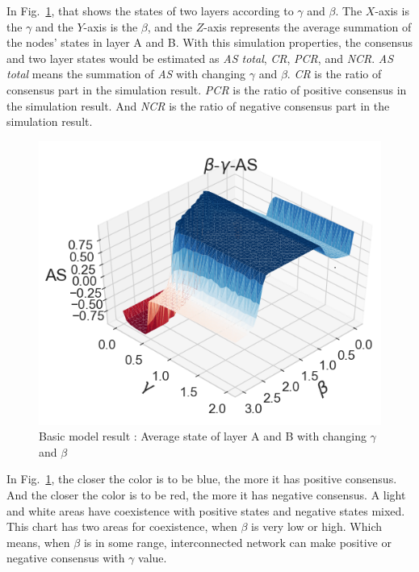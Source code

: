 \documentclass[english]{cccconf}
\begin{document}
In Fig.~\ref{Fig3}, that shows the states of two layers according to $\gamma$ and $\beta$. The $X$-axis is the $\gamma$ and the $Y$-axis is the $\beta$, and the $Z$-axis represents the average summation of the nodes' states in layer A and B. With this simulation properties, the consensus and two layer states would be estimated as \textit{AS total}, \textit{CR}, \textit{PCR}, and \textit{NCR}. \textit{AS total} means the summation of \textit{AS} with changing $\gamma$ and $\beta$. \textit{CR} is the ratio of consensus part in the simulation result. \textit{PCR} is the ratio of positive consensus in the simulation result. And \textit{NCR} is the ratio of negative consensus part in the simulation result.  
\begin{figure}[!htb]
  \centering
  \includegraphics[width=\hsize]{FIG3.png}
  \caption{Basic model result : Average state of layer A and B with changing $\gamma$ and $\beta$}
  \label{Fig3}
\end{figure}
In Fig.~\ref{Fig3}, the closer the color is to be blue, the more it has positive consensus. And the closer the color is to be red, the more it has negative consensus. A light and white areas have coexistence with positive states and negative states mixed. This chart has two areas for coexistence, when $\beta$ is very low or high. Which means, when $\beta$ is in some range, interconnected network can make positive or negative consensus with $\gamma$ value.
\end{document}
